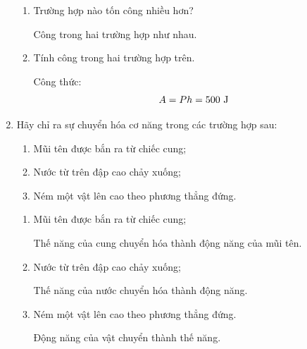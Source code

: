 \begin{enumerate}[label=\bfseries Câu \arabic*:]
{\begin{enumerate}
			Lợi bao nhiêu lần về lực thì thiệt bấy nhiêu lần về đường đi. Vậy trường hợp hai có lợi về lực hơn 2 lần so với trường hợp thứ nhất.
			
			\item Trường hợp nào tốn công nhiều hơn?
			
			Công trong hai trường hợp như nhau.
			
			\item Tính công trong hai trường hợp trên.
			
			Công thức: $$A=Ph=500\ \text J$$
		\end{enumerate}
	}
	\item {}
	
	\cauhoi
	{Hãy chỉ ra sự chuyển hóa cơ năng trong các trường hợp sau:
		\begin{enumerate}
			\item Mũi tên được bắn ra từ chiếc cung;
			\item Nước từ trên đập cao chảy xuống;
			\item Ném một vật lên cao theo phương thẳng đứng.
		\end{enumerate}
	}
	
	\loigiai
	{
		\begin{enumerate}
	\item Mũi tên được bắn ra từ chiếc cung;
	
	Thế năng của cung chuyển hóa thành động năng của mũi tên.
	
	\item Nước từ trên đập cao chảy xuống;
	
	Thế năng của nước chuyển hóa thành động năng.
	
	\item Ném một vật lên cao theo phương thẳng đứng.
	
	Động năng của vật chuyển thành thế năng.
\end{enumerate}
	}
\end{enumerate}